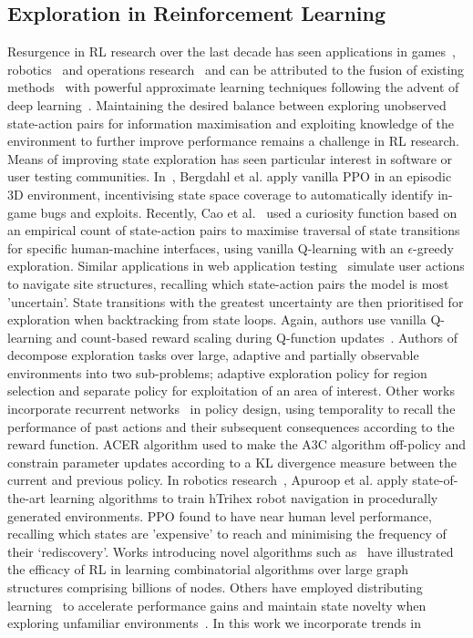\documentclass[conference,compsoc]{IEEEtran}
\begin{document}
\subsection{Exploration in Reinforcement Learning}
Resurgence in RL research over the last decade has seen applications in games~\cite{schaul2015prioritized, silver2016mastering, vinyals2019grandmaster}, robotics~\cite{gu2017deep, bloesch2022towards} and operations research~\cite{mazyavkina2021reinforcement} and can be attributed to the fusion of existing methods~\cite{watkins1992q} with powerful approximate learning techniques following the advent of deep learning~\cite{lecun2015deep}. Maintaining the desired balance between exploring unobserved state-action pairs for information maximisation and exploiting knowledge of the environment to further improve performance remains a challenge in RL research. Means of improving state exploration has seen particular interest in software or user testing communities. In~\cite{9231552}, Bergdahl et al. apply vanilla PPO in an episodic 3D environment, incentivising state space coverage to automatically identify in-game bugs and exploits. Recently, Cao et al.~\cite{9678703} used a curiosity function based on an empirical count of state-action pairs to maximise traversal of state transitions for specific human-machine interfaces, using vanilla Q-learning with an $\epsilon$-greedy exploration. Similar applications in web application testing~\cite{9402046} simulate user actions to navigate site structures, recalling which state-action pairs the model is most 'uncertain'. State transitions with the greatest uncertainty are then prioritised for exploration when backtracking from state loops. Again, authors use vanilla Q-learning and count-based reward scaling during Q-function updates~\cite{tang2017exploration}. Authors of~\cite{9476756} decompose exploration tasks over large, adaptive and partially observable environments into two sub-problems; adaptive exploration policy for region selection and separate policy for exploitation of an area of interest. Other works~\cite{s21041067} incorporate recurrent networks~\cite{medsker2001recurrent} in policy design, using temporality to recall the performance of past actions and their subsequent consequences according to the reward function. ACER algorithm used to make the A3C algorithm off-policy and constrain parameter updates according to a KL divergence measure between the current and previous policy. In robotics research~\cite{electronics10222751}, Apuroop et al. apply state-of-the-art learning algorithms to train hTrihex robot navigation in procedurally generated environments. PPO found to have near human level performance, recalling which states are 'expensive' to reach and minimising the frequency of their `rediscovery'. Works introducing novel algorithms such as~\cite{manchanda2019learning} have illustrated the efficacy of RL in learning combinatorial algorithms over large graph structures comprising billions of nodes. Others have employed distributing learning~\cite{hoffman2020acme} to accelerate performance gains and maintain state novelty when exploring unfamiliar environments~\cite{ostrovski2017countbased, haarnoja2018soft, gordillo2021improving}. In this work we incorporate trends in 
\end{document}
